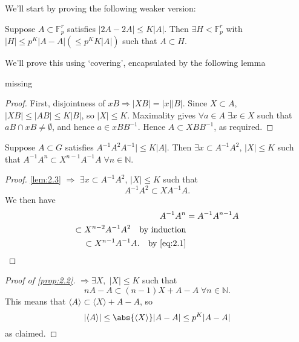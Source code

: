 \documentclass{article}
\newcommand{\F}{\mathbb{F}}
\numberwithin{equation}{section}
\begin{document}
We'll start by proving the following weaker version:
\begin{nprop}\label{prop:2.2}
  Suppose $A \subset \F_p^r$ satisfies $|2A - 2A| \leq K|A|$. Then $\exists H < \F_p^r$ with $|H| \leq p^K |A - A| (\leq p^K K |A|)$ such that $A \subset H$.
\end{nprop}
We'll prove this using `covering', encapsulated by the following lemma
\begin{nlemma}\label{lem:2.3}
  missing %
\end{nlemma}
\begin{proof}
  First, disjointness of $xB \Rightarrow |XB| = |x| |B|$. Since $X \subset A$, $|XB| \leq |AB| \leq K|B|$, so $|X| \leq K$.
  Maximality gives $\forall a \in A \; \exists x \in X$ such that $aB \cap xB \neq \emptyset$, and hence $a \in x B B^{-1}$.
  Hence $A \subset X B B^{-1}$, as required.
\end{proof}
\begin{nlemma}\label{lem:2.4}
  Suppose $A \subset G$ satisfies $A^{-1} A^2 A^{-1}| \leq K|A|$. Then $\exists x \subset A^{-1} A^2$, $|X| \leq K$ such that $A^{-1} A^n \subset X^{n-1} A^{-1} A \; \forall n \in \mathbb{N}$.
\end{nlemma}
\begin{proof}
  \cref{lem:2.3} $\Rightarrow$ $\exists x \subset A^{-1} A^2$, $|X| \leq K$ such that
  \begin{equation}
    A^{-1} A^2 \subset X A^{-1} A. \label{eq:2.1}
  \end{equation}
  We then have
  \begin{align*}
    A^{-1} A^n &= A^{-1} A^{n-1} A \\
    \subset X^{n-2} A^{-1} A^2 \quad\text{by induction}\\
    \subset X^{n-1} A^{-1} A. \quad\text{by \eqref{eq:2.1}}\qedhere
  \end{align*}
\end{proof}
\begin{proof}[Proof of \cref{prop:2.2}]
   $\Rightarrow \exists X,\; |X| \leq K$ such that
  \begin{equation*}
    nA - A \subset (n-1) X + A - A \; \forall n \in \mathbb{N}.
  \end{equation*}
  This means that
  $\langle A \rangle \subset \langle X \rangle + A - A$, so
  \begin{equation*}
    |\langle A \rangle | \leq \abs{\langle X \rangle} |A-A| \leq p^K |A-A|
  \end{equation*}
  as claimed.
\end{proof}
\end{document}
